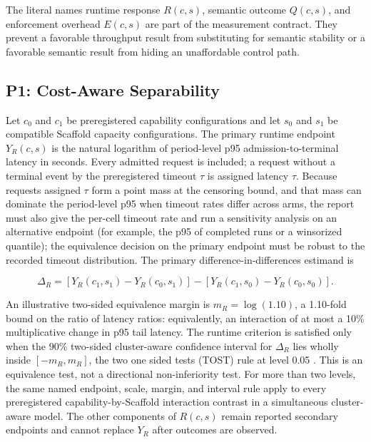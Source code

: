 The literal names runtime response $R(c,s)$, semantic outcome $Q(c,s)$, and enforcement overhead $E(c,s)$ are part of the measurement contract. They prevent a favorable throughput result from substituting for semantic stability or a favorable semantic result from hiding an unaffordable control path.

\subsection{P1: Cost-Aware Separability}
\label{sec:p1}

Let $c_0$ and $c_1$ be preregistered capability configurations and let $s_0$ and $s_1$ be compatible Scaffold capacity configurations. The primary runtime endpoint $Y_R(c,s)$ is the natural logarithm of period-level p95 admission-to-terminal latency in seconds. Every admitted request is included; a request without a terminal event by the preregistered timeout $\tau$ is assigned latency $\tau$. Because requests assigned $\tau$ form a point mass at the censoring bound, and that mass can dominate the period-level p95 when timeout rates differ across arms, the report must also give the per-cell timeout rate and run a sensitivity analysis on an alternative endpoint (for example, the p95 of completed runs or a winsorized quantile); the equivalence decision on the primary endpoint must be robust to the recorded timeout distribution. The primary difference-in-differences estimand is

\begin{equation}
\Delta_R =
[Y_R(c_1,s_1)-Y_R(c_0,s_1)]
-[Y_R(c_1,s_0)-Y_R(c_0,s_0)].
\end{equation}

An illustrative two-sided equivalence margin is $m_R=\log(1.10)$, a 1.10-fold bound on the ratio of latency ratios: equivalently, an interaction of at most a 10\% multiplicative change in p95 tail latency. The runtime criterion is satisfied only when the 90\% two-sided cluster-aware confidence interval for $\Delta_R$ lies wholly inside $[-m_R,m_R]$, the two one sided tests (TOST) rule at level 0.05 \cite{schuirmann1987tost}. This is an equivalence test, not a directional non-inferiority test. For more than two levels, the same named endpoint, scale, margin, and interval rule apply to every preregistered capability-by-Scaffold interaction contrast in a simultaneous cluster-aware model. The other components of $R(c,s)$ remain reported secondary endpoints and cannot replace $Y_R$ after outcomes are observed.

